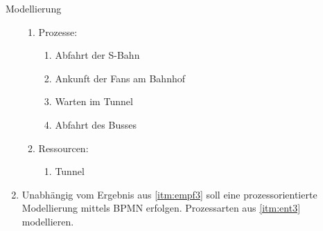 \documentclass{article}
\begin{document}
\begin{exercise}{Modellierung}
\begin{enumerate}
\begin{solution}
\begin{enumerate}
              \item Prozesse:
                    \begin{enumerate}
                      \item Abfahrt der S-Bahn
                      \item Ankunft der Fans am Bahnhof
                      \item Warten im Tunnel
                      \item Abfahrt des Busses
                    \end{enumerate}
              \item Ressourcen:
                    \begin{enumerate}
                      \item Tunnel
                    \end{enumerate}
            \end{enumerate}
          \end{solution}
    \item Unabhängig vom Ergebnis aus \ref{itm:empf3} soll eine prozessorientierte Modellierung mittels BPMN erfolgen. Prozessarten aus \ref{itm:ent3} modellieren.
          \begin{solution}
          \end{solution}
  \end{enumerate}
\end{exercise}
\end{document}

